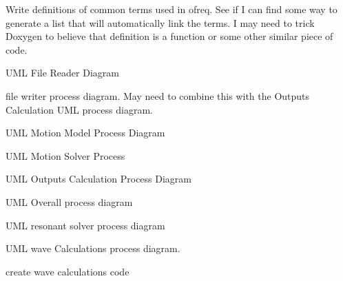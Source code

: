 
\begin{DoxyRefList}
\item[\label{todo__todo000001}%
\hypertarget{todo__todo000001}{}%
Page \hyperlink{definitions}{Definitions} ]Write definitions of common terms used in ofreq. See if I can find some way to generate a list that will automatically link the terms. I may need to trick Doxygen to believe that definition is a function or some other similar piece of code. 
\item[\label{todo__todo000002}%
\hypertarget{todo__todo000002}{}%
Page \hyperlink{_u_m_l__file_reader}{File Reader Process} ]U\-M\-L File Reader Diagram 
\item[\label{todo__todo000009}%
\hypertarget{todo__todo000009}{}%
Page \hyperlink{_u_m_l__writing_files}{File Writer Process} ]file writer process diagram. May need to combine this with the Outputs Calculation U\-M\-L process diagram. 
\item[\label{todo__todo000003}%
\hypertarget{todo__todo000003}{}%
Page \hyperlink{_u_m_l__motion_model}{Motion Model Process} ]U\-M\-L Motion Model Process Diagram 
\item[\label{todo__todo000004}%
\hypertarget{todo__todo000004}{}%
Page \hyperlink{_u_m_l__motion_solver}{Motion Solver Process} ]U\-M\-L Motion Solver Process 
\item[\label{todo__todo000005}%
\hypertarget{todo__todo000005}{}%
Page \hyperlink{_u_m_l__outputs_calculation}{Outputs Calculation} ]U\-M\-L Outputs Calculation Process Diagram 
\item[\label{todo__todo000006}%
\hypertarget{todo__todo000006}{}%
Page \hyperlink{_u_m_l__overall}{Overall Process} ]U\-M\-L Overall process diagram 
\item[\label{todo__todo000007}%
\hypertarget{todo__todo000007}{}%
Page \hyperlink{_u_m_l__resonant_solver}{Resonant Solver Process} ]U\-M\-L resonant solver process diagram 
\item[\label{todo__todo000008}%
\hypertarget{todo__todo000008}{}%
Page \hyperlink{_u_m_l__wave_calculation}{Wave Calculations Process} ]U\-M\-L wave Calculations process diagram. 

create wave calculations code
\end{DoxyRefList}
